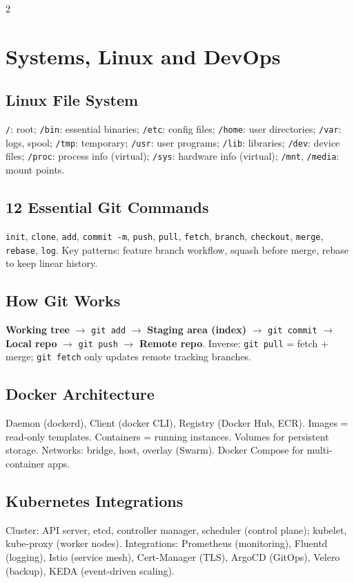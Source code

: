 \documentclass[10pt,a4paper]{article}
\begin{document}
\begin{multicols}{2}
\section{Systems, Linux and DevOps}

\subsection{Linux File System}
\texttt{/}: root; \texttt{/bin}: essential binaries; \texttt{/etc}: config files; \texttt{/home}: user directories; \texttt{/var}: logs, spool; \texttt{/tmp}: temporary; \texttt{/usr}: user programs; \texttt{/lib}: libraries; \texttt{/dev}: device files; \texttt{/proc}: process info (virtual); \texttt{/sys}: hardware info (virtual); \texttt{/mnt}, \texttt{/media}: mount points.

\subsection{12 Essential Git Commands}
\texttt{init}, \texttt{clone}, \texttt{add}, \texttt{commit -m}, \texttt{push}, \texttt{pull}, \texttt{fetch}, \texttt{branch}, \texttt{checkout}, \texttt{merge}, \texttt{rebase}, \texttt{log}. Key patterns: feature branch workflow, squash before merge, rebase to keep linear history.

\subsection{How Git Works}
\textbf{Working tree} $\to$ \texttt{git add} $\to$ \textbf{Staging area (index)} $\to$ \texttt{git commit} $\to$ \textbf{Local repo} $\to$ \texttt{git push} $\to$ \textbf{Remote repo}. Inverse: \texttt{git pull} = fetch + merge; \texttt{git fetch} only updates remote tracking branches.

\subsection{Docker Architecture}
Daemon (dockerd), Client (docker CLI), Registry (Docker Hub, ECR). Images = read-only templates. Containers = running instances. Volumes for persistent storage. Networks: bridge, host, overlay (Swarm). Docker Compose for multi-container apps.

\subsection{Kubernetes Integrations}
Cluster: API server, etcd, controller manager, scheduler (control plane); kubelet, kube-proxy (worker nodes). Integrations: Prometheus (monitoring), Fluentd (logging), Istio (service mesh), Cert-Manager (TLS), ArgoCD (GitOps), Velero (backup), KEDA (event-driven scaling).


\end{multicols}
\end{document}
